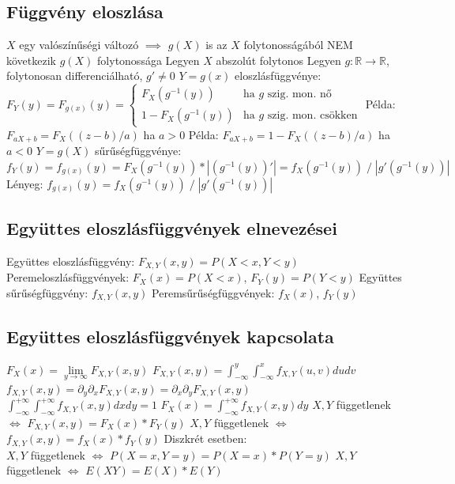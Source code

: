 \documentclass[12pt,a4paper]{article}
\begin{document}
\subsection{Függvény eloszlása}

\begin{outline}
	\1 $X$ egy valószínűségi változó $\implies$ $g(X)$ is az
	\1 $X$ folytonosságából NEM következik $g(X)$ folytonossága
	\1 Legyen $X$ abszolút folytonos
	\1 Legyen $g : \mathbb{R} \to \mathbb{R}$, folytonosan differenciálható, $g' \ne 0$
	\1 $Y=g(x)$ eloszlásfüggvénye:\\
	$F_Y(y) = F_{g(x)}(y) = \begin{cases}
	F_X(g^{-1}(y)) & \text{ha $g$ szig. mon. nő}\\
	1 - F_X(g^{-1}(y)) & \text{ha $g$ szig. mon. csökken}
	\end{cases}$
		\2 Példa: $F_{aX+b} = F_X((z-b)/a)$ ha $a > 0$
		\2 Példa: $F_{aX+b} = 1 - F_X((z-b)/a)$ ha $a < 0$
	\1 $Y=g(X)$ sűrűségfüggvénye:\\
	$f_Y(y) = f_{g(x)}(y) = F_X(g^{-1}(y)) * |(g^{-1}(y))'| = f_X(g^{-1}(y)) \;/\; |g'(g^{-1}(y))|$\\
	Lényeg: $f_{g(x)}(y) = f_X(g^{-1}(y)) \;/\; |g'(g^{-1}(y))|$
\end{outline}

\pagebreak

\subsection{Együttes eloszlásfüggvények elnevezései}

\begin{outline}
	\1 Együttes eloszlásfüggvény: $F_{X,Y}(x,y) = P(X < x, Y < y)$
	\1 Peremeloszlásfüggvények: $F_X(x) = P(X < x)$, $F_Y(y) = P(Y < y)$
	\1 Együttes sűrűségfüggvény: $f_{X,Y}(x,y)$
	\1 Peremsűrűségfüggvények: $f_X(x)$, $f_Y(y)$
\end{outline}

\subsection{Együttes eloszlásfüggvények kapcsolata}

\begin{outline}
	\1 $F_X(x) = \lim\limits_{y \to \infty} F_{X,Y}(x,y)$
	\1 $F_{X,Y}(x,y) = \int_{-\infty}^{y} \int_{-\infty}^{x} f_{X,Y}(u,v) dudv$
	\1 $f_{X,Y}(x,y) = \partial_y \partial_x F_{X,Y}(x,y) = \partial_x \partial_y F_{X,Y}(x,y)$
	\1 $\int_{-\infty}^{+\infty} \int_{-\infty}^{+\infty} f_{X,Y}(x,y) dxdy = 1$
	\1 $F_X(x) = \int_{-\infty}^{+\infty} f_{X,Y}(x,y)dy$
	\1 $X,Y$ függetlenek $\Leftrightarrow$ $F_{X,Y}(x,y) = F_X(x)*F_Y(y)$
	\1 $X,Y$ függetlenek $\Leftrightarrow$ $f_{X,Y}(x,y) = f_X(x)*f_Y(y)$
	\1 Diszkrét esetben:\\
	$X,Y$ függetlenek $\Leftrightarrow$ $P(X = x, Y = y) = P(X = x) * P(Y = y)$
	\1 $X,Y$ függetlenek $\Leftrightarrow$ $E(XY) = E(X) * E(Y)$
\end{outline}
\end{document}
